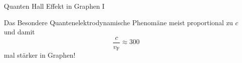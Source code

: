\documentclass[../defence.tex]{subfiles}
\begin{document}
  \begin{frame}{Quanten Hall Effekt in Graphen I}
    \begin{alert}{Das Besondere}
      Quantenelektrodynamische Phenomäne meist proportional zu $c$ und damit
      \begin{equation*}
        \frac{c}{v_\mathrm{F}}\approx 300
      \end{equation*}
      mal stärker in Graphen!
    \end{alert}
    \note{

    }
  \end{frame}
\end{document}
